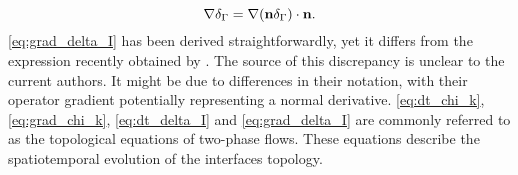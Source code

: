 \begin{equation}
    \grad\delta_\Gamma  
    =   \grad (\textbf{n} \delta_\Gamma) \cdot \textbf{n}.
    \label{eq:grad_delta_I}
\end{equation}
\ref{eq:grad_delta_I} has been derived straightforwardly, yet it differs from the expression recently obtained by \citet{orlando2023evolution}.  The source of this discrepancy is unclear to the current authors. 
It might be due to differences in their notation, with their operator gradient potentially representing a normal derivative. 
\ref{eq:dt_chi_k}, \ref{eq:grad_chi_k}, \ref{eq:dt_delta_I} and \ref{eq:grad_delta_I}  are commonly referred to as the topological equations of two-phase flows.
These equations describe the spatiotemporal evolution of the interfaces topology.

